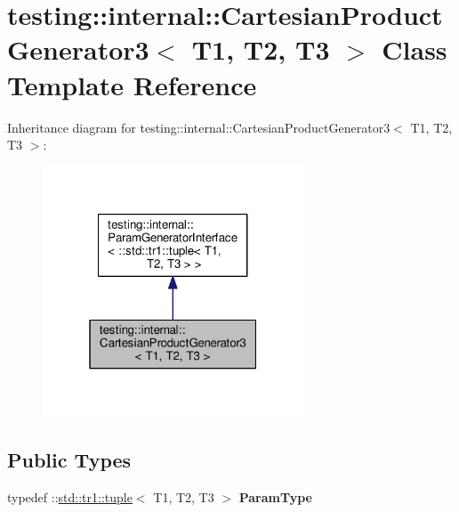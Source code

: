 \hypertarget{classtesting_1_1internal_1_1_cartesian_product_generator3}{}\section{testing\+:\+:internal\+:\+:Cartesian\+Product\+Generator3$<$ T1, T2, T3 $>$ Class Template Reference}
\label{classtesting_1_1internal_1_1_cartesian_product_generator3}


Inheritance diagram for testing\+:\+:internal\+:\+:Cartesian\+Product\+Generator3$<$ T1, T2, T3 $>$\+:
\nopagebreak
\begin{figure}[H]
\begin{center}
\leavevmode
\includegraphics[width=220pt]{classtesting_1_1internal_1_1_cartesian_product_generator3__inherit__graph}
\end{center}
\end{figure}
\subsection*{Public Types}
\begin{DoxyCompactItemize}
\item 
\mbox{\label{classtesting_1_1internal_1_1_cartesian_product_generator3_a8819b73a6af2ecca7d25e09f759f2757}} 
typedef \+::\mbox{\hyperlink{classstd_1_1tr1_1_1tuple}{std\+::tr1\+::tuple}}$<$ T1, T2, T3 $>$ {\bfseries Param\+Type}
\end{DoxyCompactItemize}
